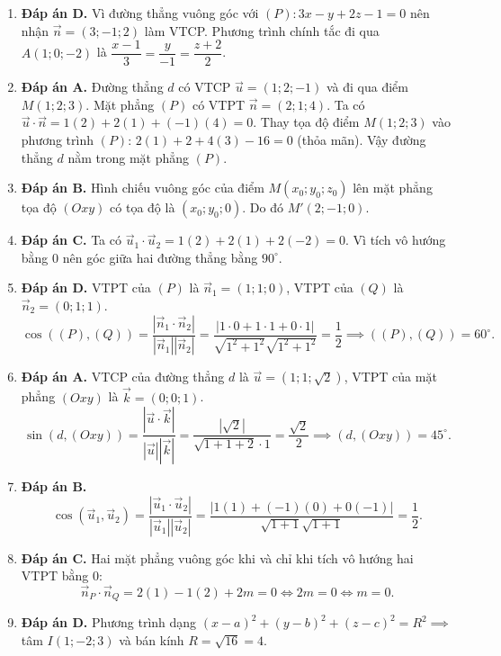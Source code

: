 \documentclass[12pt,a4paper]{article}
\begin{document}
\begin{enumerate}
\item \textbf{Đáp án D.}  
Vì đường thẳng vuông góc với $(P): 3x - y + 2z - 1 = 0$ nên nhận $\vec{n} = (3; -1; 2)$ làm VTCP. Phương trình chính tắc đi qua $A(1; 0; -2)$ là $\dfrac{x-1}{3} = \dfrac{y}{-1} = \dfrac{z+2}{2}$.

\item \textbf{Đáp án A.}  
Đường thẳng $d$ có VTCP $\vec{u} = (1; 2; -1)$ và đi qua điểm $M(1; 2; 3)$.  
Mặt phẳng $(P)$ có VTPT $\vec{n} = (2; 1; 4)$.  
Ta có $\vec{u} \cdot \vec{n} = 1(2) + 2(1) + (-1)(4) = 0$.  
Thay tọa độ điểm $M(1; 2; 3)$ vào phương trình $(P)$: $2(1) + 2 + 4(3) - 16 = 0$ (thỏa mãn).  
Vậy đường thẳng $d$ nằm trong mặt phẳng $(P)$.

\item \textbf{Đáp án B.}  
Hình chiếu vuông góc của điểm $M(x_0; y_0; z_0)$ lên mặt phẳng tọa độ $(Oxy)$ có tọa độ là $(x_0; y_0; 0)$. Do đó $M'(2; -1; 0)$.

\item \textbf{Đáp án C.}  
Ta có $\vec{u}_1 \cdot \vec{u}_2 = 1(2) + 2(1) + 2(-2) = 0$.  
Vì tích vô hướng bằng $0$ nên góc giữa hai đường thẳng bằng $90^\circ$.

\item \textbf{Đáp án D.}  
VTPT của $(P)$ là $\vec{n}_1 = (1; 1; 0)$, VTPT của $(Q)$ là $\vec{n}_2 = (0; 1; 1)$.
\[
\cos((P), (Q)) = \dfrac{|\vec{n}_1 \cdot \vec{n}_2|}{|\vec{n}_1||\vec{n}_2|} = \dfrac{|1\cdot 0 + 1\cdot 1 + 0\cdot 1|}{\sqrt{1^2 + 1^2}\sqrt{1^2 + 1^2}} = \dfrac{1}{2} \implies ((P), (Q)) = 60^\circ.
\]

\item \textbf{Đáp án A.}  
VTCP của đường thẳng $d$ là $\vec{u} = (1; 1; \sqrt{2})$, VTPT của mặt phẳng $(Oxy)$ là $\vec{k} = (0; 0; 1)$.
\[
\sin(d, (Oxy)) = \dfrac{|\vec{u} \cdot \vec{k}|}{|\vec{u}||\vec{k}|} = \dfrac{|\sqrt{2}|}{\sqrt{1 + 1 + 2}\cdot 1} = \dfrac{\sqrt{2}}{2} \implies (d, (Oxy)) = 45^\circ.
\]

\item \textbf{Đáp án B.}  
\[
\cos(\vec{u}_1, \vec{u}_2) = \dfrac{|\vec{u}_1 \cdot \vec{u}_2|}{|\vec{u}_1||\vec{u}_2|} = \dfrac{|1(1) + (-1)(0) + 0(-1)|}{\sqrt{1 + 1}\sqrt{1 + 1}} = \dfrac{1}{2}.
\]

\item \textbf{Đáp án C.}  
Hai mặt phẳng vuông góc khi và chỉ khi tích vô hướng hai VTPT bằng $0$:
\[
\vec{n}_P \cdot \vec{n}_Q = 2(1) - 1(2) + 2m = 0 \iff 2m = 0 \iff m = 0.
\]

\item \textbf{Đáp án D.}  
Phương trình dạng $(x-a)^2 + (y-b)^2 + (z-c)^2 = R^2 \implies$ tâm $I(1; -2; 3)$ và bán kính $R = \sqrt{16} = 4$.


\end{enumerate}
\end{document}
